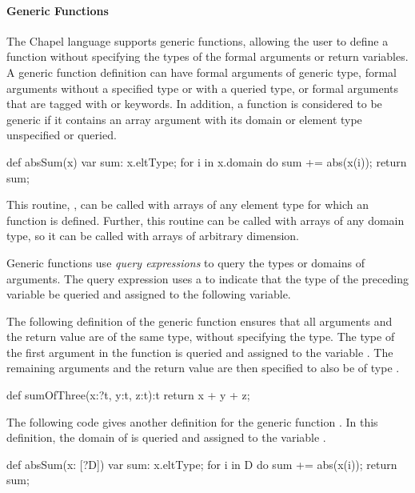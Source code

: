 \paragraph{Generic Functions}
The Chapel language supports generic functions, allowing the user
to define a function without specifying the types of the formal arguments
or return variables.  A generic function definition can have formal arguments  
of generic type, formal arguments without a specified type or 
with a queried type, or formal arguments that are tagged with 
 or  keywords.  In addition, a function is
considered to be generic if it contains an array argument with its
domain or element type unspecified or queried.

\begin{example}
\begin{chapel}
def absSum(x) {
  var sum: x.eltType;
  for i in x.domain do sum += abs(x(i));
  return sum;
}
\end{chapel}
This routine, , can be called
with arrays of any element type for which an  function is
defined.  Further, this routine can be called with arrays of 
any domain type, so it can be called with arrays of arbitrary dimension.
\end{example}

Generic functions use {\em query expressions} to query the types
or domains of arguments.
The query expression uses a  to indicate that the type of the
preceding variable be queried and assigned to the following variable.

\begin{example}
The following definition of the generic function  
ensures that all arguments and the return value are of the same type, 
without specifying the type.
The type of the first argument in the 
function is queried and assigned to the variable .  The remaining
arguments and the return value are then specified to also be of type .
\begin{chapel}
def sumOfThree(x:?t, y:t, z:t):t {
   return x + y + z;
}
\end{chapel}

The following code gives another definition for the generic function
.  In this definition, the domain of  is queried
and assigned to the variable .  
\begin{chapel}
def absSum(x: [?D]) {
  var sum: x.eltType;
  for i in D do sum += abs(x(i));
  return sum;
}
\end{chapel}
\end{example}

